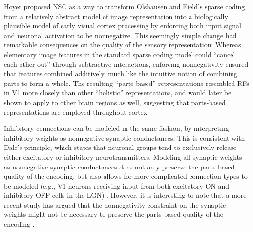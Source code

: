 Hoyer \citep{Hoyer2002,Hoyer2003} proposed \ac{NSC} as a way 
to transform Olshausen and Field's sparse coding 
from a relatively abstract model of image representation 
into a biologically plausible model of early visual cortex processing
by enforcing both input signal and neuronal activation to be nonnegative.
This seemingly simple change had remarkable consequences on the quality of the
sensory representation:
Whereas elementary image features in the standard sparse coding model could
``cancel each other out'' through subtractive interactions,
enforcing nonnegativity ensured that features combined additively,
much like the intuitive notion of combining parts to form a whole.
The resulting ``parts-based'' representations resembled \acp{RF} in \ac{V1} more closely
than other ``holistic'' representations,
and would later be shown to apply to other brain regions as well,
suggesting that parts-based representations are employed throughout cortex.

Inhibitory connections can be modeled in the same fashion,
by interpreting inhibitory weights as nonnegative synaptic conductances.
This is consistent with Dale's principle, which states that neuronal groups
tend to exclusively release either excitatory or inhibitory neurotransmitters.
Modeling all synaptic weights as nonnegative synaptic conductances does not only
preserve the parts-based quality of the encoding,
but also allows for more complicated connection types to be modeled
(e.g., \ac{V1} neurons receiving input from both excitatory ON
and inhibitory OFF cells in the \ac{LGN})
\citep{Hoyer2003}.
However, it is interesting to note that a more recent study has argued
that the nonnegativity constraint on the
synaptic weights might not be necessary to preserve the parts-based quality of
the encoding \citep{Liu2017}.

